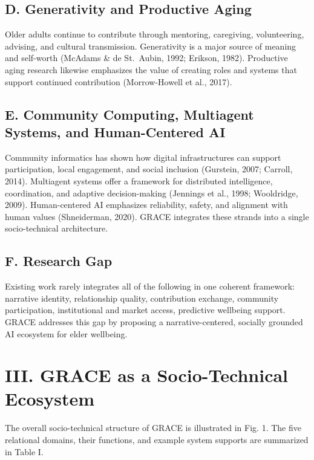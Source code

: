 \documentclass[
  journal,
]{IEEEtran}%
\begin{document}
\subsection{D. Generativity and Productive
Aging}\label{d.-generativity-and-productive-aging}

Older adults continue to contribute through mentoring, caregiving,
volunteering, advising, and cultural transmission. Generativity is a
major source of meaning and self-worth (McAdams \& de St.~Aubin, 1992;
Erikson, 1982). Productive aging research likewise emphasizes the value
of creating roles and systems that support continued contribution
(Morrow-Howell et al., 2017).

\subsection{E. Community Computing, Multiagent Systems, and
Human-Centered
AI}\label{e.-community-computing-multiagent-systems-and-human-centered-ai}

Community informatics has shown how digital infrastructures can support
participation, local engagement, and social inclusion (Gurstein, 2007;
Carroll, 2014). Multiagent systems offer a framework for distributed
intelligence, coordination, and adaptive decision-making (Jennings et
al., 1998; Wooldridge, 2009). Human-centered AI emphasizes reliability,
safety, and alignment with human values (Shneiderman, 2020). GRACE
integrates these strands into a single socio-technical architecture.

\subsection{F. Research Gap}\label{f.-research-gap}

Existing work rarely integrates all of the following in one coherent
framework: narrative identity, relationship quality, contribution
exchange, community participation, institutional and market access,
predictive wellbeing support. GRACE addresses this gap by proposing a
narrative-centered, socially grounded AI ecosystem for elder wellbeing.

\section{III. GRACE as a Socio-Technical
Ecosystem}\label{iii.-grace-as-a-socio-technical-ecosystem}

The overall socio-technical structure of GRACE is illustrated in Fig. 1.
The five relational domains, their functions, and example system
supports are summarized in Table I.
\end{document}
